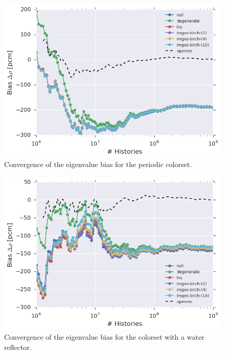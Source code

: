 \begin{figure}[h!]
\centering
\includegraphics[width=0.88\linewidth]{figures/results/convergence/2x2/keff-bias-evo}
\vspace{2mm}
\caption[Eigenvalue bias convergence with MC histories]{Convergence of the eigenvalue bias for the periodic colorset.}
\label{fig:chap11-2x2-eigenvalue-converge}
\end{figure}

\begin{figure}[h!]
\centering
\includegraphics[width=0.88\linewidth]{figures/results/convergence/reflector/keff-bias-evo}
\vspace{2mm}
\caption[Eigenvalue bias convergence with MC histories]{Convergence of the eigenvalue bias for the colorset with a water reflector.}
\label{fig:chap11-refl-eigenvalue-converge}
\end{figure}

\clearpage

